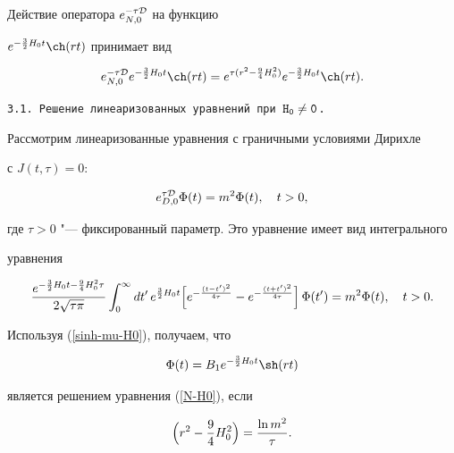 Действие оператора $e^{-\tau{\cal D}}_{N,0}$ на функцию

$e^{-\frac32H_0t}\ch (rt)$ принимает вид

\begin{equation*}

e^{-\tau{\cal D}}_{N,0}e^{-\frac32H_0t}\ch (rt)=

e^{\tau (r^2-\frac94H_0^2)}e^{-\frac32H_0t}\ch  (rt).


\end{equation*}



\smallskip



{\tt 3.1. Решение линеаризованных уравнений при $\tt H_0\neq 0$.}

Рассмотрим линеаризованные уравнения с граничными условиями Дирихле

с $J(t,\tau)= 0$:

\begin{equation*}


e^{\tau \cal D}_{D,0}\Phi(t)=m^2\Phi(t), \quad t>0,

\end{equation*}

где $\tau >0$ "--- фиксированный параметр. Это уравнение имеет вид интегрального

уравнения

\begin{equation}

\label{N-H0}

\frac{e^{-\frac32H_0t-\frac94H_0^2\tau}}{2\sqrt{\tau\pi} } \int_0^\infty

dt'\,e^{\frac32H_0t}\Bigl[e^{-\frac{(t-t')^2}{4\tau}}-e^{-\frac{(t+t')^2}{4\tau}}\Bigr] \,\Phi(t')

=m^2\Phi(t), \quad t>0.

\end{equation}

Используя (\ref{sinh-mu-H0}), получаем, что

\begin{equation*}

\Phi(t)=B_1e^{-\frac32H_0t}\sh (rt)

\end{equation*}

является решением уравнения (\ref{N-H0}), если

\begin{equation}

\label{r-H0}

\Bigl(r^2-\frac94H_0^2\Bigr)=\frac{\ln m^2}{\tau}.

\end{equation}

